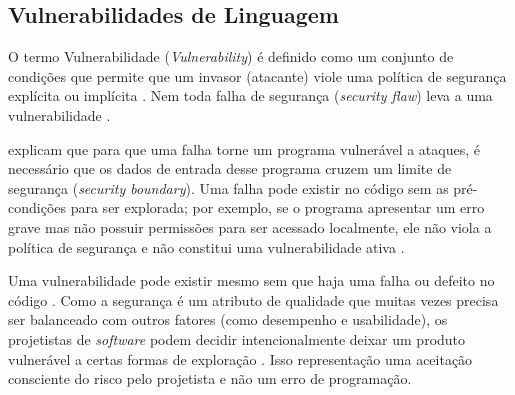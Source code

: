 \documentclass[
    12pt,                %
    openright,           %
    oneside,             %
    a4paper,             %
    english,             %
    brazil               %
]{abntex2}
\begin{document}
\subsection{Vulnerabilidades de Linguagem}
\label{sec:vulnerabilidadeslinguagem}
\par
O termo Vulnerabilidade (\textit{Vulnerability}) é definido como um conjunto de condições que permite que um invasor (atacante) viole uma política de segurança explícita ou implícita \cite{seacord2013secure, seicertc2016}.
Nem toda falha de segurança (\textit{security flaw}) leva a uma vulnerabilidade \cite{seacord2013secure}.
\par
{} explicam que para que uma falha torne um programa vulnerável a ataques, é necessário que os dados de entrada desse programa cruzem um limite de segurança (\textit{security boundary}).
Uma falha pode existir no código sem as pré-condições para ser explorada; por exemplo, se o programa apresentar um erro grave mas não possuir permissões para ser acessado localmente, ele não viola a política de segurança e não constitui uma vulnerabilidade ativa \cite{seacord2013secure}.
\par
Uma vulnerabilidade pode existir mesmo sem que haja uma falha ou defeito no código \cite{seacord2013secure}.
Como a segurança é um atributo de qualidade que muitas vezes precisa ser balanceado com outros fatores (como desempenho e usabilidade), os projetistas de \textit{software} podem decidir intencionalmente deixar um produto vulnerável a certas formas de exploração \cite{seacord2013secure}.
Isso representação uma aceitação consciente do risco pelo projetista e não um erro de programação.
\end{document}
